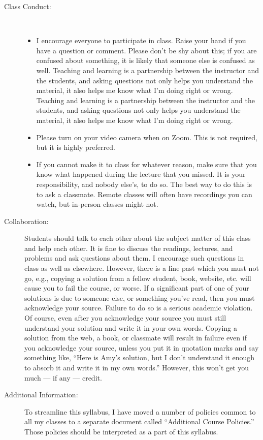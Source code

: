\documentclass [letterpaper,11pt]{article}
\begin{document}
\begin{description}
\item[Class Conduct:] \
   \begin{itemize}\setlength{\itemsep}{0em}\setlength{\parskip}{0pt}
   	\item I encourage everyone to participate in class. Raise your hand if you have a question or
comment. Please don't be shy about this; if you are confused about something, it is likely
that someone else is confused as well. Teaching and learning is a partnership between
the instructor and the students, and asking questions not only helps you understand the
material, it also helps me know what I'm doing right or wrong.
		Teaching and learning is a partnership between the instructor and the students, and asking questions not only helps you understand the material, it also
		helps me know what I'm doing right or wrong.
	\item Please turn on your video camera when on Zoom.  This is not required, but it is highly preferred.
	\item  If you cannot make it to class for whatever reason, make sure that you know what
happened during the lecture that you missed. It is your responsibility, and nobody
else's, to do so. The best way to do this is to ask a classmate.  Remote classes will  often
have recordings you can watch, but in-person classes might not. 
	     
     \end{itemize}


\item[Collaboration:]
Students should talk to each other about the subject matter of this class and help each other.  It is fine to discuss the readings, lectures, and problems and ask questions about them. I encourage such questions in class as well as elsewhere. However, there is a line past which you must not go, e.g., copying a solution from a fellow student, book, website, etc. will cause you to fail the course, or worse. If a significant part of one of your solutions is due to someone else, or something you've read, then you must acknowledge your source. Failure to do so is a serious academic violation. Of course, even after you acknowledge your source you must still understand your solution and write it in your own words. Copying a solution from the web, a book, or classmate will result in failure even if you acknowledge your source, unless you put it in quotation marks and say something like, ``Here is Amy's solution, but I don't understand it enough to absorb it and write it in my own words.'' However, this won't get you much --- if any --- credit. 



\item[Additional Information:] To streamline this syllabus, I have moved a number of policies
common to all my classes to a separate document called ``Additional Course Policies.'' 
Those policies should be interpreted as a part of this syllabus.






\end{description}
\end{document}
